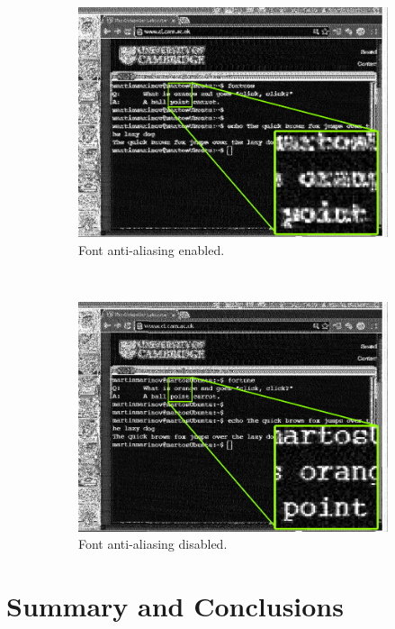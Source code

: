 \documentclass[a4paper,12pt,twoside,openright]{report}
\begin{document}
\begin{figure}[h!]
  \vspace{1cm}
  \begin{subfigure}[b]{0.45\textwidth}
  \includegraphics[width=\textwidth]{antialise_on}
  \caption{Font anti-aliasing enabled.}
\end{subfigure} ~
\begin{subfigure}[b]{0.45\textwidth}
  \includegraphics[width=\textwidth]{antialise_off}
  \caption{Font anti-aliasing disabled.}
\end{subfigure}
  \caption{}
  \label{fig:antialiseonoff}
\end{figure}

\chapter{Summary and Conclusions} 
\label{chap:summary}
\end{document}
